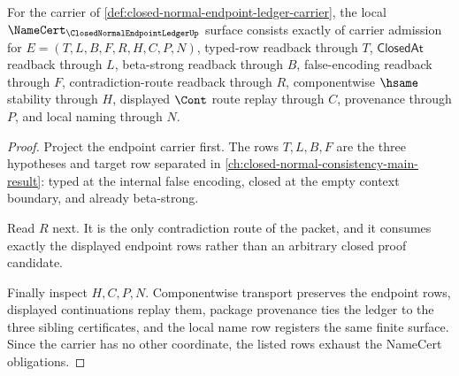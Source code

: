 \begin{theorem}
\label{thm:closed-normal-endpoint-ledger-namecert-obligations}
For the carrier of \autoref{def:closed-normal-endpoint-ledger-carrier}, the local $\NameCert_{\ClosedNormalEndpointLedgerUp}$ surface consists exactly of carrier admission for $E=(T,L,B,F,R,H,C,P,N)$, typed-row readback through $T$, $\mathsf{ClosedAt}$ readback through $L$, beta-strong readback through $B$, false-encoding readback through $F$, contradiction-route readback through $R$, componentwise $\hsame$ stability through $H$, displayed $\Cont$ route replay through $C$, provenance through $P$, and local naming through $N$.
\end{theorem}
\begin{proof}
Project the endpoint carrier first. The rows $T,L,B,F$ are the three hypotheses and target row separated in \autoref{ch:closed-normal-consistency-main-result}: typed at the internal false encoding, closed at the empty context boundary, and already beta-strong.

Read $R$ next. It is the only contradiction route of the packet, and it consumes exactly the displayed endpoint rows rather than an arbitrary closed proof candidate.

Finally inspect $H,C,P,N$. Componentwise transport preserves the endpoint rows, displayed continuations replay them, package provenance ties the ledger to the three sibling certificates, and the local name row registers the same finite surface. Since the carrier has no other coordinate, the listed rows exhaust the NameCert obligations.
\end{proof}

